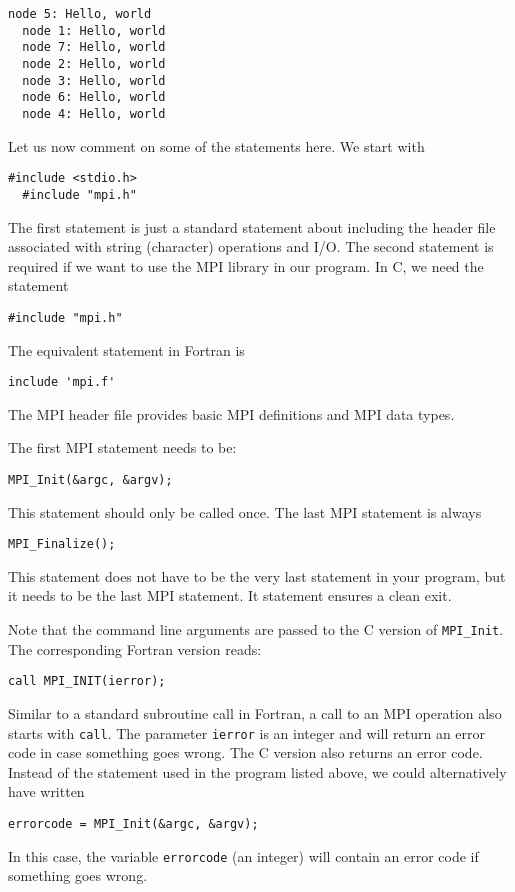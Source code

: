 \begin{lstlisting}[float, caption={Hello world MPI in C: $8$ processors.}, label=lst:mpi-hello-8]
  node 5: Hello, world
  node 1: Hello, world
  node 7: Hello, world
  node 2: Hello, world
  node 3: Hello, world
  node 6: Hello, world
  node 4: Hello, world
\end{lstlisting}

Let us now comment on some of the statements here. We start with
\begin{lstlisting}[style=c]
  #include <stdio.h>
  #include "mpi.h"
\end{lstlisting}
The first statement is just a standard statement about including the header file
associated with string (character) operations and I/O. The second statement is
required if we want to use the MPI library in our program. In C, we need the
statement
\begin{lstlisting}[style=c]
  #include "mpi.h"
\end{lstlisting}
The equivalent statement in Fortran is
\begin{lstlisting}[style=fortran]
  include 'mpi.f'
\end{lstlisting}
The MPI header file provides basic MPI definitions and MPI data types.

The first MPI statement needs to be:
\begin{lstlisting}[style=c]
  MPI_Init(&argc, &argv);
\end{lstlisting}
This statement should only be called once. The last MPI statement is always
\begin{lstlisting}[style=c]
  MPI_Finalize();
\end{lstlisting}
This statement does not have to be the very last statement in your program, but
it needs to be the last MPI statement. It statement ensures a clean exit.

Note that the command line arguments are passed to the C version of
\texttt{MPI\_Init}. The corresponding Fortran version reads:
\begin{lstlisting}[style=fortran]
  call MPI_INIT(ierror);
\end{lstlisting}
Similar to a standard subroutine call in Fortran, a call to an MPI operation
also starts with \texttt{call}. The parameter \texttt{ierror} is an integer and
will return an error code in case something goes wrong. The C version also
returns an error code. Instead of the statement used in the program listed
above, we could alternatively have written
\begin{lstlisting}[style=c]
  errorcode = MPI_Init(&argc, &argv);
\end{lstlisting}
In this case, the variable \texttt{errorcode} (an integer) will contain an error
code if something goes wrong.

